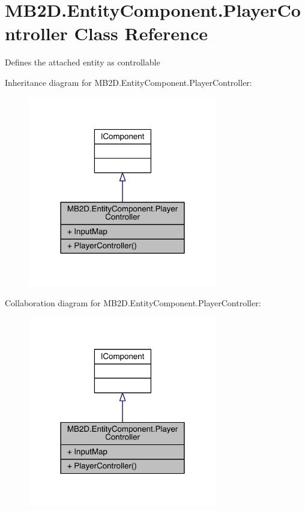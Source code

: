 \hypertarget{class_m_b2_d_1_1_entity_component_1_1_player_controller}{}\section{M\+B2\+D.\+Entity\+Component.\+Player\+Controller Class Reference}
\label{class_m_b2_d_1_1_entity_component_1_1_player_controller}


Defines the attached entity as controllable  




Inheritance diagram for M\+B2\+D.\+Entity\+Component.\+Player\+Controller\+:\nopagebreak
\begin{figure}[H]
\begin{center}
\leavevmode
\includegraphics[width=234pt]{class_m_b2_d_1_1_entity_component_1_1_player_controller__inherit__graph}
\end{center}
\end{figure}


Collaboration diagram for M\+B2\+D.\+Entity\+Component.\+Player\+Controller\+:\nopagebreak
\begin{figure}[H]
\begin{center}
\leavevmode
\includegraphics[width=234pt]{class_m_b2_d_1_1_entity_component_1_1_player_controller__coll__graph}
\end{center}
\end{figure}
